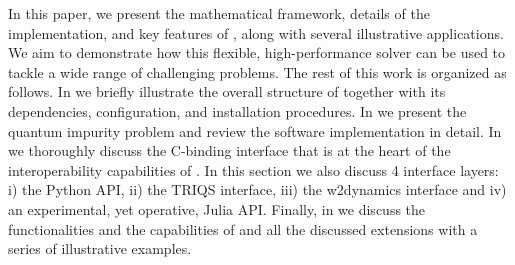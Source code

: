 \documentclass[edipack_sp.tex]{subfiles}
\begin{document}
In this paper, we present the mathematical framework, details of the implementation, and key features of \NAME, along with several illustrative applications. We aim to demonstrate how this flexible,
high-performance solver can be used to tackle a wide range of
challenging problems. 
The rest of this work is organized as follows. In  we 
briefly illustrate the overall structure of \NAME together with its dependencies, configuration, and installation procedures. In  we present the quantum impurity
problem and review the software implementation in detail. In  we thoroughly discuss the C-binding interface that is at the heart of the 
interoperability capabilities of \NAME. In this section we also discuss 4 interface layers: i) 
the Python API, ii) the TRIQS interface, iii) the w2dynamics interface and iv) an experimental, yet operative, Julia API.
Finally, in  we discuss the functionalities and the capabilities of \NAME and  all the discussed extensions with a series of illustrative examples. 

\ifSubfilesClassLoaded{
  
}{}
\end{document}
